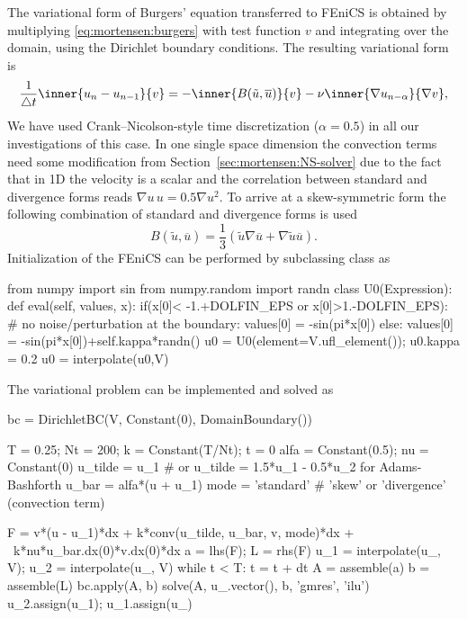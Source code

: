 The variational form of Burgers' equation transferred to FEniCS is
obtained by multiplying \eqref{eq:mortensen:burgers} with test
function $v$ and integrating over the domain, using the Dirichlet
boundary conditions. The resulting variational form is
\begin{equation}
 \frac{1}{\triangle t}\inner{ u_{n} - u_{n-1}}{v}
      = - \inner{B(\tilde{u},\overline{u})}{ v }
          - \nu \inner{ \nabla u_{n-\alpha}}{\nabla v },
\label{eq:mortensen:burgers_vf}
\end{equation}
We have used Crank--Nicolson-style time discretization ($\alpha=0.5$)
in all our investigations of this case. In one single space
dimension the convection terms need some modification from
Section~\ref{sec:mortensen:NS-solver} due to the fact that in 1D the
velocity is a scalar and the correlation between standard and divergence
forms reads $\nabla u \, u =0.5 \nabla u^2$. To arrive at a skew-symmetric
form the following combination of standard and divergence forms is used
\begin{equation}
 B(\tilde{u},\overline{u})
    = \frac{1}{3}\left( \tilde{u}\nabla \overline{u}
      + \nabla \tilde{u} \overline{u} \right).
\end{equation}
Initialization of the FEniCS  can be performed by
subclassing class  as
\begin{python}
from numpy import sin
from numpy.random import randn
class U0(Expression):
    def eval(self, values, x):
        if(x[0]< -1.+DOLFIN_EPS or x[0]>1.-DOLFIN_EPS):
            # no noise/perturbation at the boundary:
            values[0] = -sin(pi*x[0])
        else:
            values[0] = -sin(pi*x[0])+self.kappa*randn()
u0 = U0(element=V.ufl_element()); u0.kappa = 0.2
u0 = interpolate(u0,V)
\end{python}
The variational problem can be implemented and solved as
\begin{python}
bc = DirichletBC(V, Constant(0), DomainBoundary())

T = 0.25; Nt = 200; k = Constant(T/Nt); t = 0
alfa = Constant(0.5); nu = Constant(0)
u_tilde = u_1 # or u_tilde = 1.5*u_1 - 0.5*u_2 for Adams-Bashforth
u_bar = alfa*(u + u_1)
mode = 'standard'  # 'skew' or 'divergence' (convection term)

F = v*(u - u_1)*dx + k*conv(u_tilde, u_bar, v, mode)*dx + \
    k*nu*u_bar.dx(0)*v.dx(0)*dx
a = lhs(F); L = rhs(F)
u_1 = interpolate(u_, V); u_2 = interpolate(u_, V)
while t < T:
    t = t + dt
    A = assemble(a)
    b = assemble(L)
    bc.apply(A, b)
    solve(A, u_.vector(), b, 'gmres', 'ilu')
    u_2.assign(u_1); u_1.assign(u_)
\end{python}

